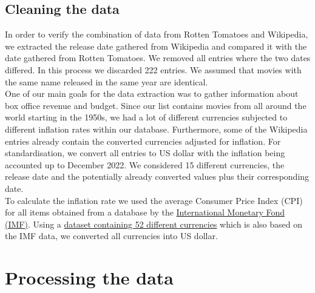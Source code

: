 \documentclass{article}
\begin{document}
\subsection{Cleaning the data}
    In order to verify the combination of data from Rotten Tomatoes and Wikipedia, we extracted the release date gathered from Wikipedia and compared it with the date gathered from Rotten Tomatoes. We removed all entries where the two dates differed. In this process we discarded 222 entries. We assumed that movies with the same name released in the same year are identical. \\
    One of our main goals for the data extraction was to gather information about box office revenue and budget. Since our list contains movies from all around the world starting in the 1950s, we had a lot of different currencies subjected to different inflation rates within our database. Furthermore, some of the Wikipedia entries already contain the converted currencies adjusted for inflation. For standardisation, we convert all entries to US dollar with the inflation being accounted up to December 2022. We considered 15 different currencies, the release date and the potentially already converted values plus their corresponding date.\\
    To calculate the inflation rate we used the average Consumer Price Index (CPI) for all items obtained from a database by the \href{https://data.imf.org/?sk=388dfa60-1d26-4ade-b505-a05a558d9a42}{International Monetary Fond (IMF)}. Using a \href{https://www.kaggle.com/datasets/thebasss/currency-exchange-rates}{dataset containing 52 different currencies} which is also based on the IMF data, we converted all currencies into US dollar.


\section{Processing the data}
    
\end{document}

